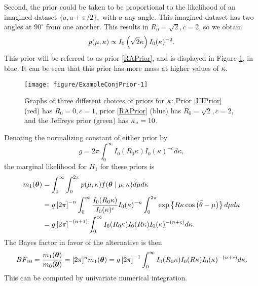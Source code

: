 Second, the prior could be taken to be proportional to the likelihood of an imagined dataset \( \{ a, a + \pi/2 \},\) with \( a \) any angle. This imagined dataset has two angles at \( 90^\circ \) from one another. This results in \( R_0 = \sqrt{2}, c = 2 \), so we obtain
\begin{equation} \label{RAPrior} %
p(\mu, \kappa) \propto I_0\left(\sqrt{2} \kp \right) I_0(\kappa)^{-2}.
\end{equation}
This prior will be referred to as prior \ref{RAPrior}, and is displayed in Figure \ref{fig:exampleprior}, in blue. It can be seen that this prior has more mass at higher values of \( \kappa.\)


\begin{figure}
\begin{center}
\begin{knitrout}
\color{fgcolor}
\texttt{[image: figure/ExampleConjPrior-1]} 

\end{knitrout}
\end{center}
\caption{Graphs of three different choices of priors for \(\kappa\): Prior \ref{UIPrior} (red) has \( R_0 = 0, c = 1\), prior \ref{RAPrior} (blue) has \( R_0 = \sqrt{2}, c = 2\), and the Jeffreys prior (green) has \( \kappa_u = 10\).}
\label{fig:exampleprior}
\end{figure}

Denoting the normalizing constant of either prior by \[ g = 2 \pi \int_0^{\infty} I_0(R_0 \kappa)I_0(\kappa)^{-c} d\kappa, \] the marginal likelihood for \( H_1 \) for these priors is
\begin{align}
m_1(\boldsymbol{\theta}) &= \int_0^{\infty}  \int_0^{2\pi} p(\mu, \kappa ) f (\boldsymbol{\theta} \mid \mu, \kappa)  d\mu d\kappa \\
&= g \left[ 2 \pi \right]^{-n} \int_0^{\infty}  \frac{I_0(R_0 \kappa)}{I_0(\kappa)^{c}}  I_0 (\kappa)^{-n} \int_0^{2\pi} \exp \left\{ R \kappa \cos \left( \bar{\theta} - \mu \right) \right\}  d\mu d\kappa \\
&= g \left[ 2 \pi \right]^{-(n + 1)}  \int_0^{\infty}   I_0(R_0 \kappa) I_0(R \kappa) I_0(\kappa)^{-(n + c)}   d\kappa.
\end{align}
The Bayes factor in favor of the alternative is then
\begin{equation}
  BF_{10} = \frac{m_1(\boldsymbol{\theta}) }{m_0(\boldsymbol{\theta})} = [2 \pi]^n m_1(\boldsymbol{\theta}) = g \left[ 2 \pi \right]^{-1}  \int_0^{\infty}   I_0(R_0 \kappa) I_0(R \kappa) I_0(\kappa)^{-(n + c)} d\kappa.
\end{equation}
This can be computed by univariate numerical integration.


